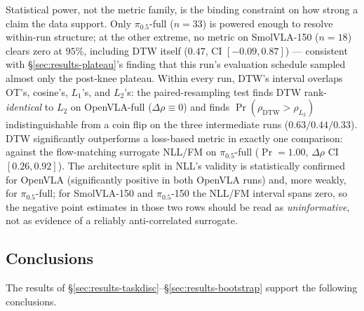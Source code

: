 \documentclass[11pt]{article}
\numberwithin{equation}{section}
\numberwithin{table}{section}
\numberwithin{figure}{section}
\begin{document}
Statistical power, not the metric family, is the binding constraint on how strong a claim the data
support. Only $\pi_{0.5}$-full ($n{=}33$) is powered enough to resolve within-run structure; at the
other extreme, no metric on SmolVLA-150 ($n{=}18$) clears zero at $95\%$, including DTW itself
($0.47$, CI $[-0.09,0.87]$) --- consistent with \S\ref{sec:results-plateau}'s finding that this run's
evaluation schedule sampled almost only the post-knee plateau. Within every run, DTW's interval overlaps
OT's, cosine's, $L_1$'s, and $L_2$'s: the paired-resampling test finds DTW rank-\emph{identical} to
$L_2$ on OpenVLA-full ($\Delta\rho\equiv0$) and finds $\Pr(\rho_{\mathrm{DTW}}>\rho_{L_2})$
indistinguishable from a coin flip on the three intermediate runs ($0.63/0.44/0.33$). DTW significantly
outperforms a loss-based metric in exactly one comparison: against the flow-matching surrogate NLL/FM on
$\pi_{0.5}$-full ($\Pr=1.00$, $\Delta\rho$ CI $[0.26,0.92]$). The architecture split in NLL's validity is
statistically confirmed for OpenVLA (significantly positive in both OpenVLA runs) and, more weakly, for
$\pi_{0.5}$-full; for SmolVLA-150 and $\pi_{0.5}$-150 the NLL/FM interval spans zero, so the negative
point estimates in those two rows should be read as \emph{uninformative}, not as evidence of a reliably
anti-correlated surrogate.

\subsection{Conclusions}
\label{sec:results-conclusions}

The results of \S\ref{sec:results-taskdisc}--\S\ref{sec:results-bootstrap} support the following
conclusions.
\end{document}
